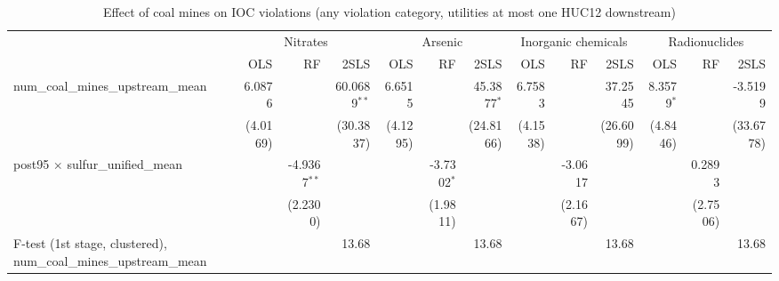
\begin{table}[htbp]
   
   \caption{\label{2sls_dwnstrm_minevio_allcat} Effect of coal mines on IOC violations (any violation category, utilities at most one HUC12 downstream)}
   \bigskip
   
   \centering
   
   \begin{adjustbox}{width = \textwidth, center}
      
      
      \begin{tabular}{lrrrrrrrrrrrr}
         \toprule
         
          & \multicolumn{3}{c}{Nitrates} & \multicolumn{3}{c}{Arsenic} & \multicolumn{3}{c}{Inorganic chemicals} & \multicolumn{3}{c}{Radionuclides}\\
         
                                                                             & OLS      & RF             & 2SLS           & OLS      & RF            & 2SLS          & OLS      & RF       & 2SLS      & OLS          & RF                    & 2SLS\\  
         
         \midrule 
         num\_coal\_mines\_upstream\_mean                                    & 6.0876   &                & 60.0689$^{**}$ & 6.6515   &               & 45.3877$^{*}$ & 6.7583   &          & 37.2545   & 8.3579$^{*}$ &                       & -3.5199\\   
                                                                             & (4.0169) &                & (30.3837)      & (4.1295) &               & (24.8166)     & (4.1538) &          & (26.6099) & (4.8446)     &                       & (33.6778)\\   
         post95 $\times$ sulfur\_unified\_mean                               &          & -4.9367$^{**}$ &                &          & -3.7302$^{*}$ &               &          & -3.0617  &           &              & 0.2893                &   \\   
                                                                             &          & (2.2300)       &                &          & (1.9811)      &               &          & (2.1667) &           &              & (2.7506)              &   \\   
         
         F-test (1st stage, clustered), num\_coal\_mines\_upstream\_mean     &          &                & 13.68          &          &               & 13.68         &          &          & 13.68     &              &                       & 13.68\\  
         

\end{tabular}
\end{adjustbox}
\end{table}
